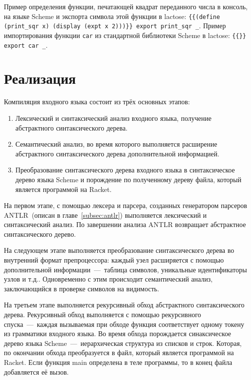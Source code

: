 \documentclass[12pt,a4paper,oneside]{extarticle}
\begin{document}
            Пример определения функции, печатающей квадрат переданного числа в консоль, на языке Scheme и экспорта символа этой функции в lactose: \lstinline${{(define (print_sqr x) (display (expt x 2)))}} export print_sqr _$.
            Пример импортирования функции \lstinline$car$ из стандартной библиотеки Scheme в lactose: \lstinline${{}} export car _$.
        
\clearpage

\section{Реализация}
    Компиляция входного языка состоит из трёх основных этапов: 
    \begin{enumerate}
        \item Лексический и синтаксический анализ входного языка, получение абстрактного синтаксического дерева.
        \item Семантический анализ, во время которого выполняется расширение абстрактного синтаксического дерева дополнительной информацией.
        \item Преобразование синтаксического дерева входного языка в синтаксическое дерево языка Scheme и порождение по полученному дереву файла, который является программой на Racket.
    \end{enumerate}

    На первом этапе, с помощью лексера и парсера, созданных генератором парсеров ANTLR~(описан в главе~\ref{subsec:antlr}) выполняется лексический и синтаксический анализ. По завершении анализа ANTLR возвращает абстрактное синтаксического дерево.
    
    На следующем этапе выполняется преобразование синтаксического дерева во внутренний формат препроцессора: каждый узел расширяется с помощью дополнительной информации~---~таблица символов, уникальные идентификаторы узлов и т.д..
    Одновременно с этим происходит семантический анализ, заключающийся в проверке символов на видимость.

    На третьем этапе выполняется рекурсивный обход абстрактного синтаксического дерева.
    Рекурсивный обход выполняется с помощью рекурсивного спуска~---~каждая вызываемая при обходе функция соответствует одному токену из грамматики входного языка.
    Во время обхода порождается синаксическое дерево языка Sсheme~---~иерархическая структура из списков и строк. Которая, по окончании обхода преобразуется в файл, который является программой на Racket.
    Если функция main определена в теле программы, то в конец файла добавляется её вызов.
\end{document}

